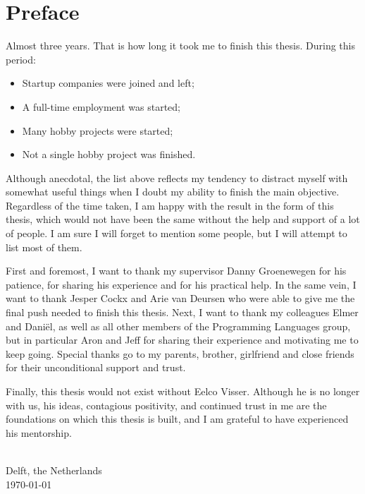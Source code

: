 
\chapter{\label{chap:Preface}Preface}

Almost three years. That is how long it took me to finish this thesis. During this period:

\begin{itemize}
 \item Startup companies were joined and left;
 \item A full-time employment was started;
 \item Many hobby projects were started;
 \item Not a single hobby project was finished.
\end{itemize}

Although anecdotal, the list above reflects my tendency to distract myself with somewhat useful things when I doubt my ability to finish the main objective.
Regardless of the time taken, I am happy with the result in the form of this thesis, which would not have been the same without the help and support of a lot of people.
I am sure I will forget to mention some people, but I will attempt to list most of them.

First and foremost, I want to thank my supervisor Danny Groenewegen for his patience, for sharing his experience and for his practical help.
In the same vein, I want to thank Jesper Cockx and Arie van Deursen who were able to give me the final push needed to finish this thesis.
Next, I want to thank my colleagues Elmer and Daniël, as well as all other members of the Programming Languages group, but in particular Aron and Jeff for sharing their experience and motivating me to keep going.
Special thanks go to my parents, brother, girlfriend and close friends for their unconditional support and trust.

Finally, this thesis would not exist without Eelco Visser.
Although he is no longer with us, his ideas, contagious positivity, and continued trust in me are the foundations on which this thesis is built, and I am grateful to have experienced his mentorship.

\vspace{1cm}
\begin{flushright}
\theauthor{}\\
Delft, the Netherlands\\
\today{}\\
\end{flushright}
